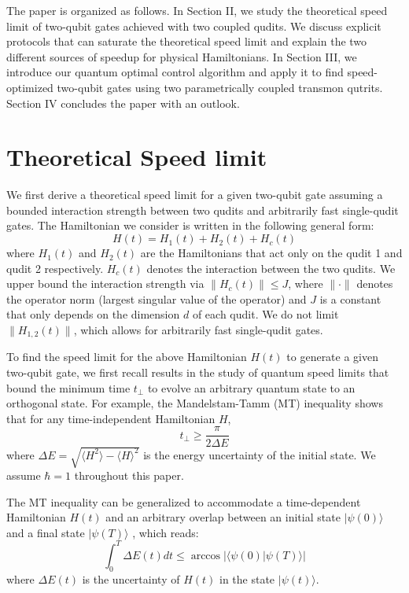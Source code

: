 \documentclass[twocolumn,english,pra,superscriptaddress]{revtex4-1}
\begin{document}
The paper is organized as follows. In Section II, we study the theoretical speed limit of two-qubit gates achieved with two coupled qudits. We discuss explicit protocols that can saturate the theoretical speed limit and explain the two different sources of speedup for physical Hamiltonians. In Section III, we introduce our quantum optimal control algorithm and apply it to find speed-optimized two-qubit gates using two parametrically coupled transmon qutrits. Section IV concludes the paper with an outlook.


\section{Theoretical Speed limit}

We first derive a theoretical speed limit for a given two-qubit gate assuming a bounded interaction strength between two qudits and arbitrarily fast single-qudit gates. The Hamiltonian we consider is written in the following general form:
\begin{equation} \label{Ht}
    H(t) = H_1(t) + H_2(t) + H_c(t)
\end{equation}
where $H_1(t)$ and $H_2(t)$ are the Hamiltonians that act only on the qudit 1 and qudit 2 respectively. $H_c(t)$ denotes the interaction between the two qudits. We upper bound the interaction strength via $\lVert H_c(t) \rVert \le J$, where $\lVert \cdot \rVert$ denotes the operator norm (largest singular value of the operator) and $J$ is a constant that only depends on the dimension $d$ of each qudit. We do not limit $\lVert H_{1,2}(t) \rVert$, which allows for arbitrarily fast single-qudit gates.

To find the speed limit for the above Hamiltonian $H(t)$ to generate a given two-qubit gate, we first recall results in the study of quantum speed limits \cite{QST} that bound the minimum time $t_{\perp}$ to evolve an arbitrary quantum state to an orthogonal state. For example, the Mandelstam-Tamm (MT) inequality \cite{MT} shows that for any time-independent Hamiltonian $H$, 
\begin{equation}
    t_\perp \geq \frac{\pi}{2\Delta E} \label{MTEq}
\end{equation}
where $\Delta E = \sqrt{\langle H^2 \rangle - \langle H \rangle^2}$ is the energy uncertainty of the initial state. We assume $\hbar=1$ throughout this paper.

The MT inequality can be generalized to accommodate a time-dependent Hamiltonian $H(t)$ and an arbitrary overlap between an initial state $|\psi(0)\rangle$ and a final state $|\psi(T)\rangle$ \cite{MT}, which reads:
\begin{equation} \label{MTtime}
   \int_0^{T} \Delta E(t) dt \le \arccos{|\langle \psi(0)|\psi(T)\rangle|}
\end{equation}
where $\Delta E(t)$ is the uncertainty of $H(t)$ in the state $|\psi(t)\rangle$. 
\end{document}
